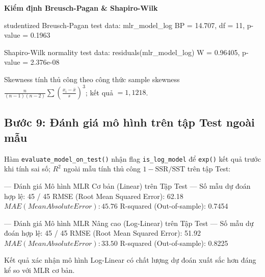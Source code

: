 \textbf{Kiểm định Breusch-Pagan \& Shapiro-Wilk}
\begin{rconsole}
	studentized Breusch-Pagan test
data:  mlr_model_log
BP = 14.707, df = 11, p-value = 0.1963

	Shapiro-Wilk normality test
data:  residuals(mlr_model_log)
W = 0.96405, p-value = 2.376e-08
\end{rconsole}
Skewness tính thủ công theo công thức sample skewness $\frac{n}{(n-1)(n-2)}\sum\!\left(\frac{x_i - \bar{x}}{s}\right)^{\!3}$; kết quả $= 1{,}1218$.

\subsection{Bước 9: Đánh giá mô hình trên tập Test ngoài mẫu}
\label{sec:buoc_9}
Hàm \texttt{evaluate\_model\_on\_test()} nhận flag \texttt{is\_log\_model} để \texttt{exp()} kết quả trước khi tính sai số; $R^2$ ngoài mẫu tính thủ công $1 - \text{SSR}/\text{SST}$ trên tập Test:
\begin{rconsole}
--- Đánh giá Mô hình MLR Cơ bản (Linear) trên Tập Test ---
Số mẫu dự đoán hợp lệ: 45 / 45
RMSE (Root Mean Squared Error): 62.18 $
MAE (Mean Absolute Error):      45.76 $
R-squared (Out-of-sample):      0.7454

--- Đánh giá Mô hình MLR Nâng cao (Log-Linear) trên Tập Test ---
Số mẫu dự đoán hợp lệ: 45 / 45
RMSE (Root Mean Squared Error): 51.92 $
MAE (Mean Absolute Error):      33.50 $
R-squared (Out-of-sample):      0.8225
\end{rconsole}
Kết quả xác nhận mô hình Log-Linear có chất lượng dự đoán xuất sắc hơn đáng kể so với MLR cơ bản.

